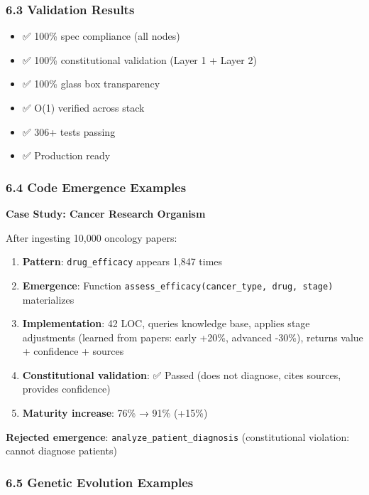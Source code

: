 \documentclass[
]{article}
\providecommand{\tightlist}{%
  \setlength{\itemsep}{0pt}\setlength{\parskip}{0pt}}
\begin{document}
\subsubsection{6.3 Validation Results}\label{validation-results}

\begin{itemize}
\tightlist
\item
  ✅ 100\% spec compliance (all nodes)
\item
  ✅ 100\% constitutional validation (Layer 1 + Layer 2)
\item
  ✅ 100\% glass box transparency
\item
  ✅ O(1) verified across stack
\item
  ✅ 306+ tests passing
\item
  ✅ Production ready
\end{itemize}

\subsubsection{6.4 Code Emergence
Examples}\label{code-emergence-examples}

\textbf{Case Study: Cancer Research Organism}

After ingesting 10,000 oncology papers:

\begin{enumerate}
\def\labelenumi{\arabic{enumi}.}
\tightlist
\item
  \textbf{Pattern}: \texttt{drug\_efficacy} appears 1,847 times
\item
  \textbf{Emergence}: Function
  \texttt{assess\_efficacy(cancer\_type,\ drug,\ stage)} materializes
\item
  \textbf{Implementation}: 42 LOC, queries knowledge base, applies stage
  adjustments (learned from papers: early +20\%, advanced -30\%),
  returns value + confidence + sources
\item
  \textbf{Constitutional validation}: ✅ Passed (does not diagnose,
  cites sources, provides confidence)
\item
  \textbf{Maturity increase}: 76\% → 91\% (+15\%)
\end{enumerate}

\textbf{Rejected emergence}: \texttt{analyze\_patient\_diagnosis}
(constitutional violation: cannot diagnose patients)

\subsubsection{6.5 Genetic Evolution
Examples}\label{genetic-evolution-examples}
\end{document}
